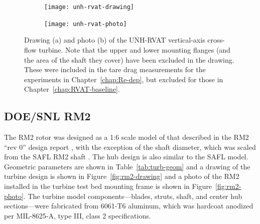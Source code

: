 \begin{figure}[ht]
    \centering
    \begin{subfigure}{0.47\textwidth}
        \texttt{[image: unh-rvat-drawing]}
        \caption{}
        \label{fig:rvat-drawing}
    \end{subfigure}
    \begin{subfigure}{0.47\textwidth}
        \texttt{[image: unh-rvat-photo]}
        \caption{}
        \label{fig:rvat-photo}
    \end{subfigure}
    
    \caption{Drawing (a) and photo (b) of the UNH-RVAT vertical-axis cross-flow
        turbine. Note that the upper and lower mounting flanges (and the area of the
        shaft they cover) have been excluded in the drawing. These were included in
        the tare drag measurements for the experiments in Chapter~\ref{chap:Re-dep},
        but excluded for those in Chapter~\ref{chap:RVAT-baseline}.}
    
    \label{fig:unh-rvat}
\end{figure}


\subsection{DOE/SNL RM2}

The RM2 rotor was designed as a 1:6 scale model of that described in the RM2
``rev 0'' design report \cite{Barone2011}, with the exception of the shaft
diameter, which was scaled from the SAFL RM2 shaft \cite{Hill2014}. The hub
design is also similar to the SAFL model. Geometric parameters are shown in
Table~\ref{tab:turb-geom} and a drawing of the turbine design is shown in
Figure~\ref{fig:rm2-drawing} and a photo of the RM2 installed in the turbine
test bed mounting frame is shown in Figure~\ref{fig:rm2-photo}. The turbine
model components---blades, struts, shaft, and center hub sections---were
fabricated from 6061-T6 aluminum, which was hardcoat anodized per MIL-8625-A,
type III, class 2 specifications.

